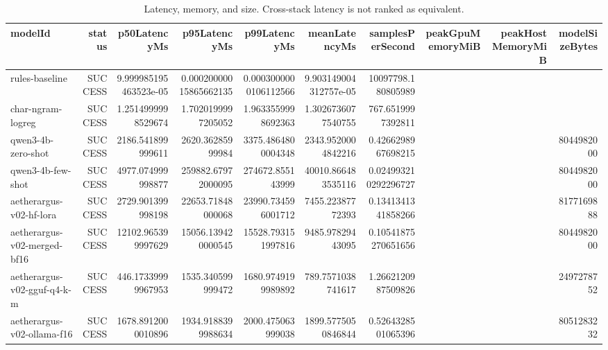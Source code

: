 \begin{table}[t]
\centering
\caption{Latency, memory, and size. Cross-stack latency is not ranked as equivalent.}
\begin{tabular}{lrrrrrrrrr}
\toprule
modelId & status & p50LatencyMs & p95LatencyMs & p99LatencyMs & meanLatencyMs & samplesPerSecond & peakGpuMemoryMiB & peakHostMemoryMiB & modelSizeBytes \\
\midrule
rules-baseline & SUCCESS & 9.999985195463523e-05 & 0.00020000015865662135 & 0.0003000000106112566 & 9.903149004312757e-05 & 10097798.180805989 &  &  &  \\
char-ngram-logreg & SUCCESS & 1.2514999998529674 & 1.7020199997205052 & 1.9633559998692363 & 1.3026736077540755 & 767.6519997392811 &  &  &  \\
qwen3-4b-zero-shot & SUCCESS & 2186.541899999611 & 2620.36285999984 & 3375.4864800004348 & 2343.9520004842216 & 0.4266298967698215 &  &  & 8044982000 \\
qwen3-4b-few-shot & SUCCESS & 4977.074999998877 & 259882.67972000095 & 274672.855143999 & 40010.866483535116 & 0.024993210292296727 &  &  & 8044982000 \\
aetherargus-v02-hf-lora & SUCCESS & 2729.901399998198 & 22653.71848000068 & 23990.734596001712 & 7455.22387772393 & 0.1341341341858266 &  &  & 8177169888 \\
aetherargus-v02-merged-bf16 & SUCCESS & 12102.965399997629 & 15056.139420000545 & 15528.793151997816 & 9485.97829443095 & 0.10541875270651656 &  &  & 8044982000 \\
aetherargus-v02-gguf-q4-k-m & SUCCESS & 446.17339999967953 & 1535.340599999472 & 1680.9749199989892 & 789.7571038741617 & 1.2662120987509826 &  &  & 2497278752 \\
aetherargus-v02-ollama-f16 & SUCCESS & 1678.8912000010896 & 1934.9188399988634 & 2000.475063999038 & 1899.5775050846844 & 0.5264328501065396 &  &  & 8051283232 \\
\bottomrule
\end{tabular}
\end{table}
